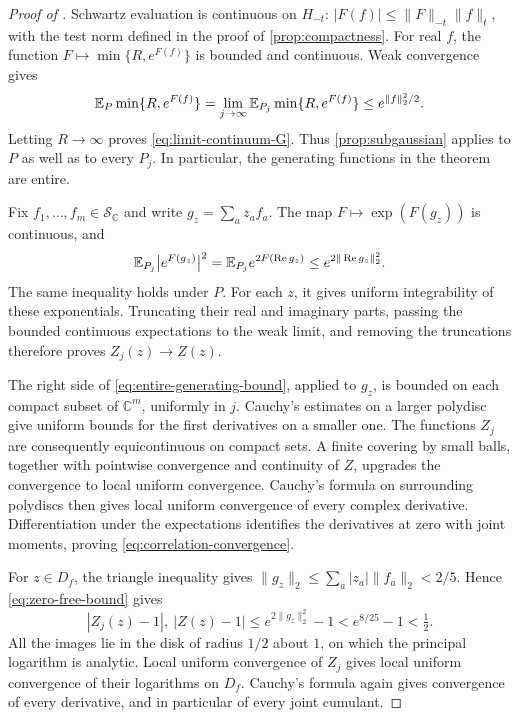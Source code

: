 \documentclass[11pt,letterpaper,reqno]{amsart}
\begin{document}
\begin{proof}[Proof of ]
Schwartz evaluation is continuous on $H_{-t}$:
$|F(f)|\le\|F\|_{-t}\|f\|_t$, with the test norm
defined in the proof of \cref{prop:compactness}.
For real $f$, the function $F\mapsto\min\{R,e^{F(f)}\}$
is bounded and continuous. Weak convergence gives
\[
 \mathbb E_P\min\{R,e^{F(f)}\}
 =\lim_{j\to\infty}\mathbb E_{P_j}\min\{R,e^{F(f)}\}
 \le e^{\|f\|_2^2/2}.
\]
Letting $R\to\infty$ proves \eqref{eq:limit-continuum-G}.
Thus \cref{prop:subgaussian} applies to $P$ as well as to
every $P_j$. In particular, the generating functions in
the theorem are entire.

Fix $f_1,\ldots,f_m\in\mathcal S_{\mathbb C}$ and write
$g_z=\sum_a z_af_a$. The map
$F\mapsto\exp(F(g_z))$ is continuous, and
\begin{equation}\label{eq:exponential-ui}
 \mathbb E_{P_j}\bigl|e^{F(g_z)}\bigr|^2
 =\mathbb E_{P_j}e^{2F(\operatorname{Re}g_z)}
 \le e^{2\|\operatorname{Re}g_z\|_2^2}.
\end{equation}
The same inequality holds under $P$. For each $z$, it gives
uniform integrability of these exponentials. Truncating their
real and imaginary parts, passing the bounded continuous
expectations to the weak limit, and removing the truncations
therefore proves $Z_j(z)\to Z(z)$.

The right side of \eqref{eq:entire-generating-bound}, applied
to $g_z$, is bounded on each compact subset of $\mathbb C^m$,
uniformly in $j$. Cauchy's estimates on a larger polydisc give
uniform bounds for the first derivatives on a smaller one.
The functions $Z_j$ are consequently equicontinuous on compact
sets. A finite covering by small balls, together with pointwise
convergence and continuity of $Z$, upgrades the convergence to
local uniform convergence. Cauchy's formula on surrounding
polydiscs then gives local uniform convergence of every complex
derivative. Differentiation under the expectations identifies
the derivatives at zero with joint moments, proving
\eqref{eq:correlation-convergence}.

For $z\in D_f$, the triangle inequality gives
$\|g_z\|_2\le\sum_a|z_a|\|f_a\|_2<2/5$. Hence
\eqref{eq:zero-free-bound} gives
\[
 |Z_j(z)-1|,\ |Z(z)-1|
 \le e^{2\|g_z\|_2^2}-1
 < e^{8/25}-1<\tfrac12.
\]
All the images lie in the disk of radius $1/2$ about $1$,
on which the principal logarithm is analytic. Local uniform
convergence of $Z_j$ gives local uniform convergence of their
logarithms on $D_f$. Cauchy's formula again gives convergence
of every derivative, and in particular of every joint cumulant.
\end{proof}
\end{document}
